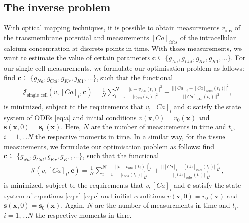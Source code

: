 \documentclass{article}
\begin{document}
\subsection{The inverse problem} \label{The inverse problem}
With optical mapping techniques, it is possible to obtain measurements $v_{\text{obs}}$ of the transmembrane potential and measurements $[Ca]_{i\text{obs}}$ of the intracellular calcium concentration at discrete points in time. With those measurements, we want to estimate the value of certain parameters $\boldsymbol{c}\subseteq \{g_{Na}, g_{Cal}, g_{Kr}, g_{K1}, \ldots \}$. For our single cell measurements, we formulate our optimisation problem as follows: find $\boldsymbol{c} \subseteq\{ g_{Na}, g_{Cal}, g_{Kr}, g_{K1}, \ldots \}$, such that the functional
\begin{eqnarray}
\mathcal{J}_{\text{single cell}}(v, [Ca]_i, \boldsymbol{c}) = \frac{1}{N} \sum_{i=1}^{N} \frac{||v-v_{\text{obs}}(t_i)||^2}{||v_{\text{obs}}(t_i)||^2} + \frac{||[Ca]_i-[Ca]_{i\text{obs}}(t_i) ||^2}{||[Ca]_{i\text{obs}}(t_i) ||^2},\label{J_sc}
\end{eqnarray}
is minimized, subject to the requirements that $v, [Ca]_i$ and $\boldsymbol{c}$ satisfy the state system of ODEs \eqref{eq:a} and initial conditions $v(\textbf{x},0)=v_0(\textbf{x})$ and $\mathbf{s}(\mathbf{x},0)=\mathbf{s}_0(\mathbf{x})$. Here, $N$ are the number of measurements in time and $t_i$, $i=1, \dots N$ the respective moments in time. 
In a similar way, for the tissue measurements, we formulate our optimisation problem as follows: find $\boldsymbol{c} \subseteq\{ g_{Na}, g_{Cal}, g_{Kr}, g_{K1}, \ldots \}$, such that the functional
\begin{eqnarray} 
\mathcal{J}(v, [Ca]_i, \boldsymbol{c}) = \frac{1}{N} \sum_{i=1}^{N} \frac{||v-v_{\text{obs}}(t_i)||^2_{L^2}}{||v_{\text{obs}}(t_i)||^2_{L^2}} + \frac{||[Ca]_i-[Ca]_{i\text{obs}}(t_i) ||^2_{L^2}}{||[Ca]_{i\text{obs}}(t_i) ||^2_{L^2}},\label{J}
\end{eqnarray}
is minimized, subject to the requirements that $v, [Ca]_i$ and $\boldsymbol{c}$ satisfy the state system of equations \eqref{eq:a}-\eqref{eq:c} and initial conditions $v(\textbf{x},0)=v_0(\textbf{x})$ and $\mathbf{s}(\mathbf{x},0)=\mathbf{s}_0(\mathbf{x})$. Again, $N$ are the number of measurements in time and $t_i$, $i=1, \dots N$ the respective moments in time. 
%
\end{document}
